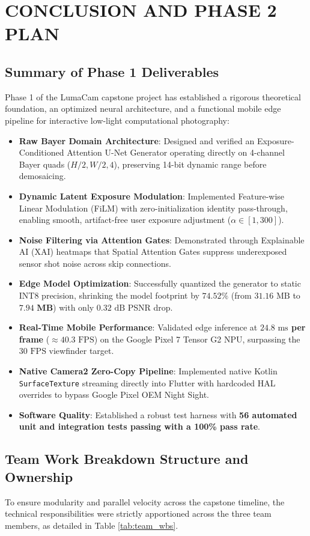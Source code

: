 \chapter{CONCLUSION AND PHASE 2 PLAN}

\section{Summary of Phase 1 Deliverables}
Phase 1 of the LumaCam capstone project has established a rigorous theoretical foundation, an optimized neural architecture, and a functional mobile edge pipeline for interactive low-light computational photography:
\begin{itemize}
    \item \textbf{Raw Bayer Domain Architecture}: Designed and verified an Exposure-Conditioned Attention U-Net Generator operating directly on 4-channel Bayer quads ($H/2, W/2, 4$), preserving 14-bit dynamic range before demosaicing.
    \item \textbf{Dynamic Latent Exposure Modulation}: Implemented Feature-wise Linear Modulation (FiLM) with zero-initialization identity pass-through, enabling smooth, artifact-free user exposure adjustment ($\alpha \in [1, 300]$).
    \item \textbf{Noise Filtering via Attention Gates}: Demonstrated through Explainable AI (XAI) heatmaps that Spatial Attention Gates suppress underexposed sensor shot noise across skip connections.
    \item \textbf{Edge Model Optimization}: Successfully quantized the generator to static INT8 precision, shrinking the model footprint by \textbf{$74.52\%$} (from $31.16\text{ MB}$ to $\mathbf{7.94\text{ MB}}$) with only $0.32\text{ dB}$ PSNR drop.
    \item \textbf{Real-Time Mobile Performance}: Validated edge inference at \textbf{$24.8\text{ ms}$ per frame} ($\approx 40.3\text{ FPS}$) on the Google Pixel 7 Tensor G2 NPU, surpassing the $30\text{ FPS}$ viewfinder target.
    \item \textbf{Native Camera2 Zero-Copy Pipeline}: Implemented native Kotlin \texttt{SurfaceTexture} streaming directly into Flutter with hardcoded HAL overrides to bypass Google Pixel OEM Night Sight.
    \item \textbf{Software Quality}: Established a robust test harness with \textbf{56 automated unit and integration tests passing with a 100\% pass rate}.
\end{itemize}

\section{Team Work Breakdown Structure and Ownership}
To ensure modularity and parallel velocity across the capstone timeline, the technical responsibilities were strictly apportioned across the three team members, as detailed in Table \ref{tab:team_wbs}.

